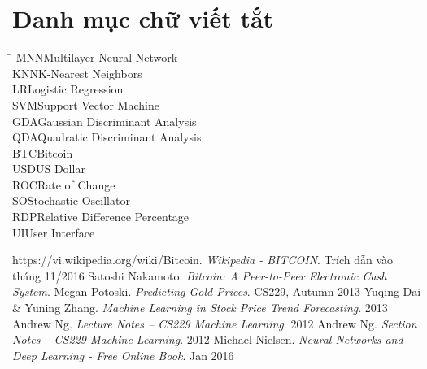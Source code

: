\documentclass[12pt,a4paper]{report}
\begin{document}
 



\tableofcontents
\pagebreak
\listoffigures
\pagebreak 
\listoftables  
\pagebreak

\chapter*{Danh mục chữ viết tắt}
\thispagestyle{plain} 
\begin{tabbing}
\hspace{3cm}\= \kill
MNN\>Multilayer Neural Network\\
KNN\>K-Nearest Neighbors\\
LR\>Logistic Regression\\
SVM\>Support Vector Machine\\
GDA\>Gaussian Discriminant Analysis\\
QDA\>Quadratic Discriminant Analysis\\
BTC\>Bitcoin\\
USD\>US Dollar\\
ROC\>Rate of Change\\
SO\>Stochastic Oscillator\\
RDP\>Relative Difference Percentage\\
UI\>User Interface\\

\end{tabbing}

\pagebreak 


 



 
\pagebreak
\begin{thebibliography}{9}

https://vi.wikipedia.org/wiki/Bitcoin. \emph{Wikipedia - BITCOIN}. Trích dẫn vào
tháng 11/2016
Satoshi Nakamoto. \emph{Bitcoin: A Peer-to-Peer Electronic Cash System}.
Megan Potoski. \emph{Predicting Gold Prices}. CS229, Autumn 2013
Yuqing Dai \& Yuning Zhang. \emph{Machine Learning in Stock Price Trend Forecasting}. 2013 
Andrew Ng. \emph{Lecture Notes – CS229 Machine Learning}. 2012
Andrew Ng. \emph{Section Notes – CS229 Machine Learning}. 2012
Michael Nielsen. \emph{Neural Networks and Deep Learning - Free Online Book}. Jan 2016
\end{thebibliography}
\end{document}
